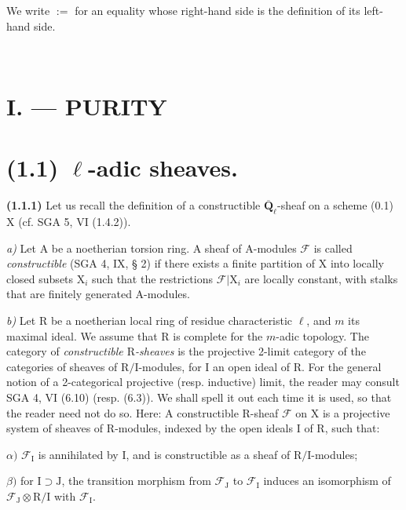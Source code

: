\documentclass[11pt,leqno]{article}
\newcommand{\Page}[1]{\ifvmode\noindent\else\unskip\ \fi{\footnotesize\textcolor{gray}{[p.\,#1]}}\ \ignorespaces}
\begin{document}
We write \(:=\) for an equality whose right-hand side is the definition of its left-hand side.

\Page{146}
\section*{\normalfont I. — PURITY}

\section*{\textbf{(1.1) \(\ell\)-adic sheaves.}}

\textbf{(1.1.1)} Let us recall the definition of a constructible \(\overline{\mathbf{Q}}_\ell\)-sheaf on a scheme (0.1) \(\mathrm{X}\) (cf. SGA 5, VI (1.4.2)).

\textit{a)} Let \(\mathrm{A}\) be a noetherian torsion ring. A sheaf of \(\mathrm{A}\)-modules \(\mathscr{F}\) is called \textit{constructible} (SGA 4, IX, § 2) if there exists a finite partition of \(\mathrm{X}\) into locally closed subsets \(\mathrm{X}_i\) such that the restrictions \(\mathscr{F}|\mathrm{X}_i\) are locally constant, with stalks that are finitely generated \(\mathrm{A}\)-modules.

\textit{b)} Let \(\mathrm{R}\) be a noetherian local ring of residue characteristic \(\ell\), and \(m\) its maximal ideal. We assume that \(\mathrm{R}\) is complete for the \(m\)-adic topology. The category of \textit{constructible \(\mathrm{R}\)-sheaves} is the projective 2-limit category of the categories of sheaves of \(\mathrm{R}/\mathrm{I}\)-modules, for \(\mathrm{I}\) an open ideal of \(\mathrm{R}\). For the general notion of a 2-categorical projective (resp. inductive) limit, the reader may consult SGA 4, VI (6.10) (resp. (6.3)). We shall spell it out each time it is used, so that the reader need not do so. Here: A constructible \(\mathrm{R}\)-sheaf \(\mathscr{F}\) on \(\mathrm{X}\) is a projective system of sheaves of \(\mathrm{R}\)-modules, indexed by the open ideals \(\mathrm{I}\) of \(\mathrm{R}\), such that:

\noindent \(\alpha)\) \(\mathscr{F}_{\mathrm{I}}\) is annihilated by \(\mathrm{I}\), and is constructible as a sheaf of \(\mathrm{R}/\mathrm{I}\)-modules;

\noindent \(\beta)\) for \(\mathrm{I}\supset\mathrm{J}\), the transition morphism from \(\mathscr{F}_{\mathrm{J}}\) to \(\mathscr{F}_{\mathrm{I}}\) induces an isomorphism of \(\mathscr{F}_{\mathrm{J}}\otimes\mathrm{R}/\mathrm{I}\) with \(\mathscr{F}_{\mathrm{I}}\).
\end{document}
